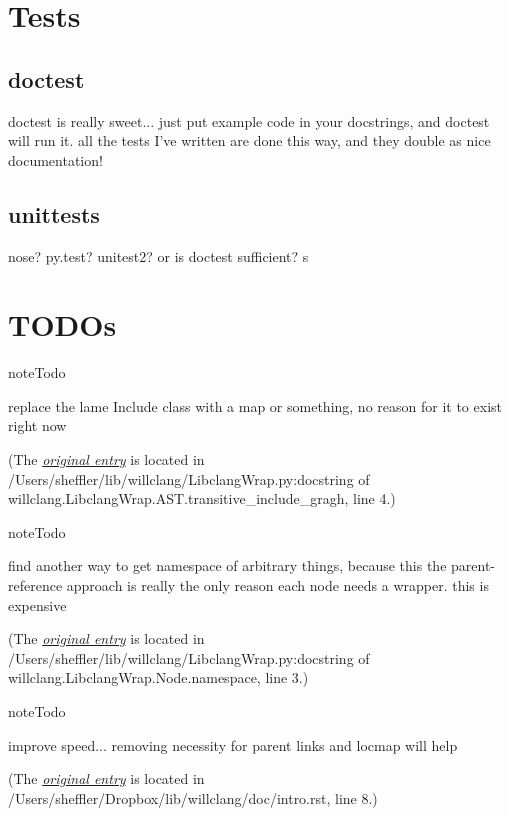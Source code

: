\documentclass[letterpaper,10pt,english]{sphinxmanual}
\begin{document}
\section{Tests}
\label{tests:tests}\label{tests::doc}

\subsection{doctest}
\label{tests:doctest}
doctest is really sweet... just put example code in your docstrings, and doctest will run it. all the tests I've written are done this way, and they double as nice documentation!


\subsection{unittests}
\label{tests:unittests}
nose? py.test? unitest2? or is doctest sufficient?
s


\section{TODOs}
\label{todo::doc}\label{todo:todos}
\begin{notice}{note}{Todo}

replace the lame Include class with a map or something, no reason for it to exist right now
\end{notice}

(The {\hyperref[code:index-0]{\emph{original entry}}} is located in  /Users/sheffler/lib/willclang/LibclangWrap.py:docstring of willclang.LibclangWrap.AST.transitive\_include\_gragh, line 4.)

\begin{notice}{note}{Todo}

find another way to get namespace of arbitrary things, because this the parent-reference approach
is really the only reason each node needs a wrapper. this is expensive
\end{notice}

(The {\hyperref[code:index-1]{\emph{original entry}}} is located in  /Users/sheffler/lib/willclang/LibclangWrap.py:docstring of willclang.LibclangWrap.Node.namespace, line 3.)

\begin{notice}{note}{Todo}

improve speed... removing necessity for parent links and locmap will help
\end{notice}

(The {\hyperref[intro:index-0]{\emph{original entry}}} is located in  /Users/sheffler/Dropbox/lib/willclang/doc/intro.rst, line 8.)
\end{document}
